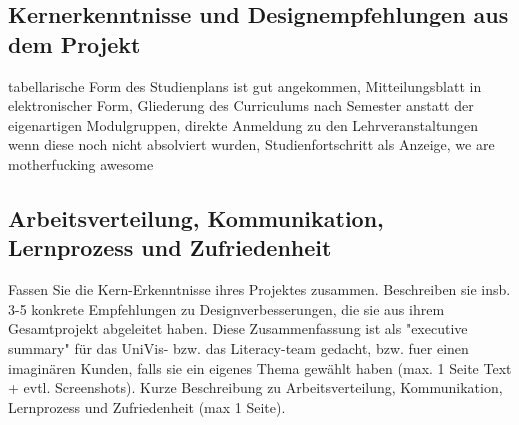 \documentclass[a4paper,10pt]{scrartcl}
\begin{document}
\subsection{Kernerkenntnisse und Designempfehlungen aus dem Projekt}

tabellarische Form des Studienplans ist gut angekommen, Mitteilungsblatt in elektronischer Form, Gliederung des Curriculums nach Semester anstatt der eigenartigen
Modulgruppen, direkte Anmeldung zu den Lehrveranstaltungen wenn diese noch nicht absolviert wurden, Studienfortschritt als Anzeige, we are motherfucking awesome

\subsection{Arbeitsverteilung, Kommunikation, Lernprozess und Zufriedenheit}


    Fassen Sie die Kern-Erkenntnisse ihres Projektes zusammen. Beschreiben sie insb. 3-5 konkrete Empfehlungen zu Designverbesserungen, 
    die sie aus ihrem Gesamtprojekt abgeleitet haben. Diese Zusammenfassung ist als "executive summary" für das UniVis- bzw. das Literacy-team gedacht, 
    bzw. fuer einen imaginären Kunden, falls sie ein eigenes Thema gewählt haben (max. 1 Seite Text + evtl. Screenshots).
    Kurze Beschreibung zu Arbeitsverteilung, Kommunikation, Lernprozess und Zufriedenheit (max 1 Seite). 
\end{document}
